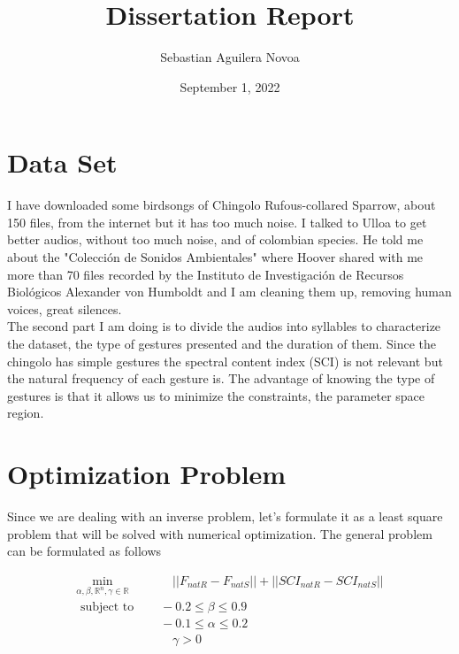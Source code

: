 \documentclass{article}
\title{\textbf{Dissertation Report}}
\author{Sebastian Aguilera Novoa} %
\date{September 1, 2022} %
\begin{document}
    \maketitle %
    
    \section{Data Set} %
    
    I have downloaded some birdsongs of Chingolo Rufous-collared Sparrow, about 150 files, from the internet but it has too much noise. I talked to Ulloa to get better audios, without too much noise, and of colombian species. He told me about the "Colección de Sonidos Ambientales" where Hoover shared with me more than 70 files recorded by the Instituto de Investigación de Recursos Biológicos Alexander von Humboldt and I am cleaning them up, removing human voices, great silences.  \\
    
    
    The second part I am doing is to divide the audios into syllables to characterize the dataset, the type of gestures presented and the duration of them. Since the chingolo has simple gestures the spectral content index (SCI) is not relevant but the natural frequency of each gesture is. The advantage of knowing the type of gestures is that it allows us to minimize the constraints, the parameter space region.
    
    
    \section{Optimization Problem}
    
    Since we are dealing with an inverse problem, let's formulate it as a least square problem that will be solved with numerical optimization.  The general problem can be formulated as follows
    
    \begin{equation}
    \begin{aligned}
    \underset{\alpha, \beta, \mathbb{R}^n, \gamma \in \mathbb{R}}{\text{min}} &\qquad || F_{natR} - F_{natS}|| + || SCI_{natR} - SCI_{natS}||\\
    \text { subject to } & \quad-0.2\leq\beta \leq 0.9\\
     & \quad -0.1 \leq \alpha \leq 0.2\\
     & \qquad \gamma >0
    \end{aligned}
    \end{equation}
    
\end{document}
